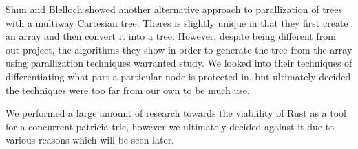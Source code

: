 \documentclass[conference]{IEEEtran}
\begin{document}
\par
Shun and Blelloch showed another alternative approach to parallization of trees with a multiway Cartesian tree. Theres is slightly unique in that they first create an array and then convert it into a tree. However, despite being different from out project, the algorithms they show in order to generate the tree from the array using parallization techniques warranted study. We looked into their techniques of differentiating what part a particular node is protected in, but ultimately decided the techniques were too far from our own to be much use. \cite{Shun2014}
\par
We performed a large amount of research towards the viabiility of Rust as a tool for a concurrent patricia trie, however we ultimately decided against it due to various reasons which will be seen later. \cite{CHAMT}
\end{document}
